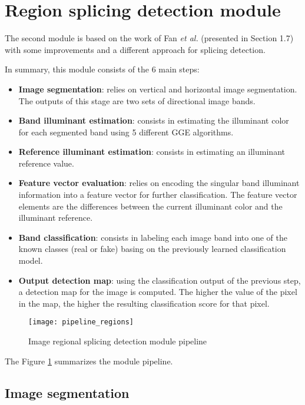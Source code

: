 \section{Region splicing detection module}

The second module is based on the work of Fan \emph{et al.}\cite{fan2015image} (presented in Section 1.7) with some improvements and a different approach for splicing detection.

In summary, this module consists of the 6 main steps:

\begin{itemize}
\item \textbf{Image segmentation}: relies on vertical and horizontal image segmentation. The outputs of this stage are two sets of directional image bands. 
\item \textbf{Band illuminant estimation}: consists in estimating the illuminant color for each segmented band using 5 different GGE algorithms.
\item \textbf{Reference illuminant estimation}: consists in estimating an illuminant reference value.
\item \textbf{Feature vector evaluation}: relies on encoding the singular band illuminant information into a feature vector for further classification. The feature vector elements are the differences between the current illuminant color and the illuminant reference.
\item \textbf{Band classification}: consists in labeling each image band into one of the known classes (real or fake) basing on the previously learned classification model.
\item \textbf{Output detection map}: using the classification output of the previous step, a detection map for the image is computed. The higher the value of the pixel in the map, the higher the resulting classification score for that pixel.
\end{itemize}

\begin{figure}[h!]
  \centering
    \texttt{[image: pipeline\_regions]}
    \caption{Image regional splicing detection module pipeline}
    \label{fig:regionsmodulepipeline}
\end{figure}

The Figure \ref{fig:regionsmodulepipeline} summarizes the module pipeline.

\subsection{Image segmentation}

